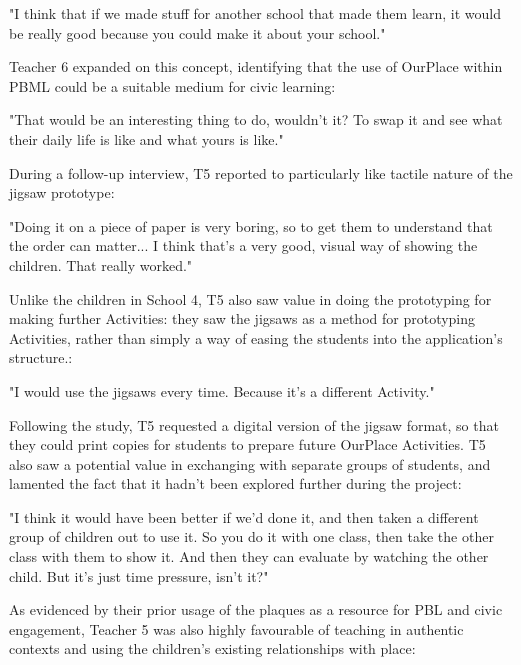 \begin{displayquote}
"I think that if we made stuff for another school that made them learn, it would be really good because you could make it about your school."
\end{displayquote}

Teacher 6 expanded on this concept, identifying that the use of OurPlace within PBML could be a suitable medium for civic learning: 

\begin{displayquote}
"That would be an interesting thing to do, wouldn't it? To swap it and see what their daily life is like and what yours is like." 
\end{displayquote}

During a follow-up interview, T5 reported to particularly like tactile nature of the jigsaw prototype: 

\begin{displayquote}
"Doing it on a piece of paper is very boring, so to get them to understand that the order can matter... I think that's a very good, visual way of showing the children. That really worked."
\end{displayquote}

Unlike the children in School 4, T5 also saw value in doing the prototyping for making further Activities: they saw the jigsaws as a method for prototyping Activities, rather than simply a way of easing the students into the application's structure.: 

\begin{displayquote}
"I would use the jigsaws every time. Because it's a different Activity."
\end{displayquote}

Following the study, T5 requested a digital version of the jigsaw format, so that they could print copies for students to prepare future OurPlace Activities. T5 also saw a potential value in exchanging with separate groups of students, and lamented the fact that it hadn't been explored further during the project: 

\begin{displayquote}
"I think it would have been better if we'd done it, and then taken a different group of children out to use it. So you do it with one class, then take the other class with them to show it. And then they can evaluate by watching the other child. But it's just time pressure, isn't it?"
\end{displayquote}

As evidenced by their prior usage of the plaques as a resource for PBL and civic engagement, Teacher 5 was also highly favourable of teaching in authentic contexts and using the children's existing relationships with place: 

